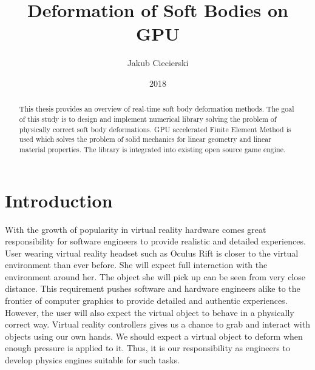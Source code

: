 \documentclass[en]{minipw} %
\title{Deformation of Soft Bodies on GPU} %
\author{Jakub Ciecierski}
\date{2018}
\begin{document}
\sloppy






\setcounter{page}{1}

\begin{abstract}
This thesis provides an overview of real-time soft body deformation methods. The goal of this study is to design and implement numerical library solving the problem of physically correct soft body deformations. GPU accelerated Finite Element Method is used which solves the problem of solid mechanics for linear geometry and linear material properties. The library is integrated into existing open source game engine.

\end{abstract}

\begin{streszczenie}



\end{streszczenie}


\makestatement


\cleardoublepage
\tableofcontents


\cleardoublepage
\pagestyle{fancy}

\chapter*{Introduction}
With the growth of popularity in virtual reality hardware comes great responsibility for software engineers to provide realistic and detailed experiences. User wearing virtual reality headset such as Oculus Rift is closer to the virtual environment than ever before. She will expect full interaction with the environment around her. The object she will pick up can be seen from very close distance. This requirement pushes software and hardware engineers alike to the frontier of computer graphics to provide detailed and authentic experiences. However, the user will also expect the virtual object to behave in a physically correct way. Virtual reality controllers gives us a chance to grab and interact with objects using our own hands. We should expect a virtual object to deform when enough pressure is applied to it. Thus, it is our responsibility as engineers to develop physics engines suitable for such tasks.
\end{document}
